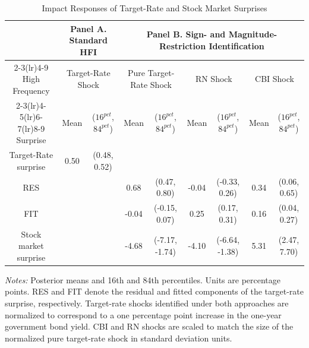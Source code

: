 \documentclass[12pt, reqno]{article}
\begin{document}
\begin{table}[t]
\hypertarget{Panel AT3}{}
\hypertarget{Panel BT3}{}
\hypertarget{Table 3}{}
\begin{center}
\resizebox{16cm}{!} {
\begin{tabular}{c c c c c c c c c}
\toprule
& \multicolumn{2}{c}{Panel A. Standard HFI}
& \multicolumn{6}{c}{Panel B. Sign- and Magnitude-Restriction Identification} \\
\cmidrule(lr){2-3}\cmidrule(lr){4-9}
High Frequency
& \multicolumn{2}{c}{Target-Rate Shock}
& \multicolumn{2}{c}{Pure Target-Rate Shock}
& \multicolumn{2}{c}{RN Shock}
& \multicolumn{2}{c}{CBI Shock} \\
\cmidrule(lr){2-3}\cmidrule(lr){4-5}\cmidrule(lr){6-7}\cmidrule(lr){8-9}
Surprise
& Mean & ($16^{pct}$, $84^{pct}$)
& Mean & ($16^{pct}$, $84^{pct}$)
& Mean & ($16^{pct}$, $84^{pct}$)
& Mean & ($16^{pct}$, $84^{pct}$) \\
\midrule
Target-Rate surprise
& 0.50 & (0.48, 0.52)
&  & 
&   & 
&   &  \\
RES
&  & 
& 0.68 & (0.47, 0.80)
& -0.04 & (-0.33, 0.26)
& 0.34 & (0.06, 0.65) \\
FIT
&   & 
& -0.04 & (-0.15, 0.07)
& 0.25 & (0.17, 0.31)
& 0.16 & (0.04, 0.27) \\
Stock market surprise
&   & 
& -4.68 & (-7.17, -1.74)
& -4.10 & (-6.64, -1.38)
& 5.31 & (2.47, 7.70) \\
\bottomrule
\end{tabular}}
\caption{Impact Responses of Target-Rate and Stock Market Surprises}
\end{center}
\begin{footnotesize}
\textit{Notes:} Posterior means and 16th and 84th percentiles. Units are percentage points. RES and FIT denote the residual and fitted components of the target-rate surprise, respectively. Target-rate shocks identified under both approaches are normalized to correspond to a one percentage point increase in the one-year government bond yield. CBI and RN shocks are scaled to match the size of the normalized pure target-rate shock in standard deviation units.
\end{footnotesize}
\end{table}
\end{document}
